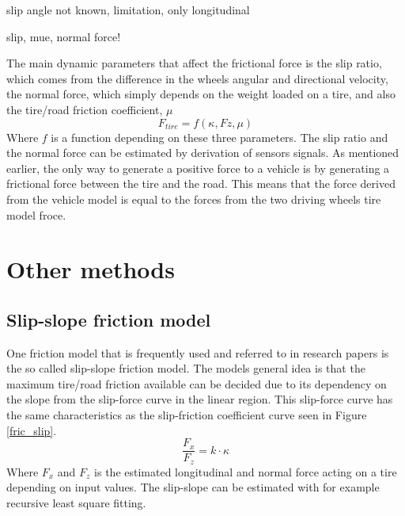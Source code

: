 slip angle not known, limitation, only longitudinal

slip, mue, normal force!

The main dynamic parameters that affect the frictional force is the slip ratio, which comes from the difference in the wheels angular and  directional velocity, the normal force, which simply depends on the weight loaded on a tire, and also the tire/road friction coefficient, $ \mu $
\begin{equation}
	F_{tire} = f(\kappa, Fz, \mu)
\end{equation}
Where $ f $ is a function depending on these three parameters. The slip ratio and the normal force can be estimated by derivation of sensors signals. As mentioned earlier, the only way to generate a positive force to a vehicle is by generating a frictional force between the tire and the road. This means that the force derived from the vehicle model is equal to the forces from the two driving wheels tire model froce.

\section{Other methods}

\subsection{Slip-slope friction model}

One friction model that is frequently used and referred to in research papers is the so called slip-slope friction model. The models general idea is that the maximum tire/road friction available can be decided due to its dependency on the slope from the slip-force curve in the linear region. This slip-force curve has the same characteristics as the slip-friction coefficient curve seen in Figure \ref{fric_slip}. 
\begin{equation}
\dfrac{F_{x}}{F_{z}} = k \cdot \kappa
\end{equation}
Where $ F_{x} $ and $ F_{z} $ is the estimated longitudinal and normal force acting on a tire depending on input values. The slip-slope can be estimated with for example recursive least square fitting.
